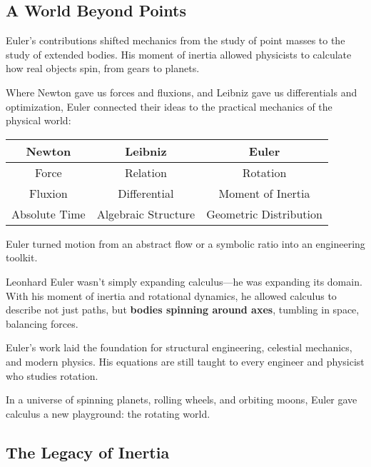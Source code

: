 \subsection{A World Beyond Points}

Euler’s contributions shifted mechanics from the study of point masses to the study of extended bodies. His moment of inertia allowed physicists to calculate how real objects spin, from gears to planets.

Where Newton gave us forces and fluxions, and Leibniz gave us differentials and optimization, Euler connected their ideas to the practical mechanics of the physical world:

\begin{center}
\begin{tabular}{c|c|c}
\textbf{Newton} & \textbf{Leibniz} & \textbf{Euler} \\
\hline
Force & Relation & Rotation \\
Fluxion & Differential & Moment of Inertia \\
Absolute Time & Algebraic Structure & Geometric Distribution \\
\end{tabular}
\end{center}

Euler turned motion from an abstract flow or a symbolic ratio into an engineering toolkit.

\begin{tcolorbox}[colback=blue!5!white, colframe=blue!50!black, 
  title={Historical Sidebar: Euler and the Calculus of Rotating Worlds}]
  
Leonhard Euler wasn’t simply expanding calculus—he was expanding its domain. With his moment of inertia and rotational dynamics, he allowed calculus to describe not just paths, but \textbf{bodies spinning around axes}, tumbling in space, balancing forces.

Euler’s work laid the foundation for structural engineering, celestial mechanics, and modern physics. His equations are still taught to every engineer and physicist who studies rotation.

\medskip

In a universe of spinning planets, rolling wheels, and orbiting moons, Euler gave calculus a new playground: the rotating world.

\end{tcolorbox}

\subsection{The Legacy of Inertia}

